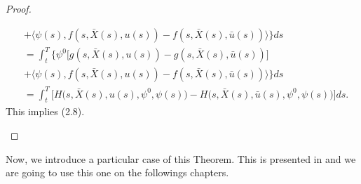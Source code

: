 \begin{proof}
\begin{asparaenum}
\begin{align*}
                &+ \big\langle \psi(s), f(s, \bar{X}(s), u(s)) - f(s, \bar{X}(s), %
                    \bar{u}(s)) \big\rangle \Big\} ds \\
                &=  \int_{t}^{T}\Big\{ \psi^{0}\Big[g(s, \bar{X}(s), u(s)) - %
                    g(s, \bar{X}(s), \bar{u}(s))\Big] \\
                &+ \big\langle \psi(s), f(s,\bar{X}(s),u(s)) - f(s,\bar{X}(s),%
                    \bar{u}(s)) \big\rangle\Big\}ds \\
                &= \int_{t}^{T}\Big[H\big(s,\bar{X}(s),u(s), \psi^{0}, \psi(s) \big) %
                    - H \big(s,\bar{X}(s),\bar{u}(s),\psi^0,\psi(s) \big)\Big]ds.
            \end{align*}
            This implies (2.8).
    \end{asparaenum}
\end{proof}

    Now, we introduce a particular case of this Theorem. This is presented in
    \citep{lenhart2007optimal} and we are going to use this one on the followings
    chapters.
\newpage